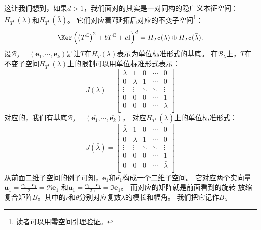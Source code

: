 \documentclass[12pt,UTF8,fontset=none]{ctexbook}
\begin{document}
这让我们想到，如果$d > 1$，我们面对的其实是一对同构的隐广义本征空间：$H_{T^\mathbb{C}}(\lambda)$和$H_{T^\mathbb{C}}(\bar{\lambda})$。
它们对应着$T$延拓后对应的不变子空间\footnote{读者可以用零空间引理验证。}：
$$\Ker \left(\left(T^\mathbb{C}\right)^2 + b T^\mathbb{C} + c\mathrm{I}\right)^{d} = H_{T^\mathbb{C}}(\lambda) \oplus H_{T^\mathbb{C}}(\bar{\lambda}). $$
设$\mathcal{B}_\lambda = (\mathbf{e}_1, \cdots , \mathbf{e}_k)$是让$T$在$H_T(\lambda)$表示为单位标准形式的基底。
在$\mathcal{B}_\lambda$上，$T$在不变子空间$H_{T^\mathbb{C}}(\lambda)$上的限制可以用单位标准形式表示：
$$ J(\lambda) = \begin{bmatrix}
    \lambda & 1 & 0 & \cdots & 0 \\
    0 & \lambda & 1 & \cdots & 0 \\
    \vdots & \vdots & \ddots & \ddots & \vdots  \\
    0 & 0 & 0 & \cdots & 1  \\
    0 & 0 & 0 & \cdots & \lambda \\
   \end{bmatrix} $$
对应的，我们有基底$\mathcal{B}_{\bar{\lambda}} = (\overline{\mathbf{e}_1}, \cdots , \overline{\mathbf{e}_k})$，
对应$H_{T^\mathbb{C}}(\bar{\lambda})$上的单位标准形式：
$$ J(\bar{\lambda}) = \begin{bmatrix}
    \bar{\lambda} & 1 & 0 & \cdots & 0 \\
    0 & \bar{\lambda} & 1 & \cdots & 0 \\
    \vdots & \vdots & \ddots & \ddots & \vdots  \\
    0 & 0 & 0 & \cdots & 1  \\
    0 & 0 & 0 & \cdots & \bar{\lambda} \\
   \end{bmatrix} $$
从前面二维子空间的例子可知，$\mathbf{e}_1$和$\overline{\mathbf{e}_1}$构成一个二维子空间。
它对应两个实向量$\mathbf{u}_1 = \frac{\mathbf{e}_1 + \overline{\mathbf{e}_1}}{2} = \Re\mathbf{e}_1$
和$\mathbf{u}_1 = \frac{\mathbf{e}_1 - \overline{\mathbf{e}_1}}{2\imath } = \Im\mathbf{e}_1$。
而对应的矩阵就是前面看到的旋转-放缩复合矩阵$B$。其中的$r$和$\theta$分别对应复数$\lambda$的模长和幅角。
我们把它记作$B_\lambda$
\end{document}
